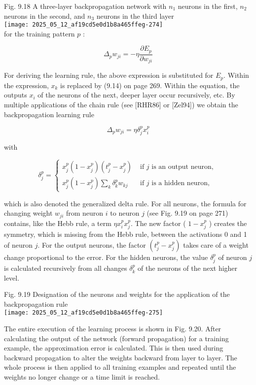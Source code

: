 \documentclass[10pt]{article}
\begin{document}
Fig. 9.18 A three-layer backpropagation network with $n_{1}$ neurons in the first, $n_{2}$ neurons in the second, and $n_{3}$ neurons in the third layer\\
\texttt{[image: 2025\_05\_12\_af19cd5e0d1b8a465ffeg-274]}\\
for the training pattern $p$ :

$$
\Delta_{p} w_{j i}=-\eta \frac{\partial E_{p}}{\partial w_{j i}}
$$

For deriving the learning rule, the above expression is substituted for $E_{p}$. Within the expression, $x_{k}$ is replaced by (9.14) on page 269. Within the equation, the outputs $x_{i}$ of the neurons of the next, deeper layer occur recursively, etc. By multiple applications of the chain rule (see [RHR86] or [Zel94]) we obtain the backpropagation learning rule

$$
\Delta_{p} w_{j i}=\eta \delta_{j}^{p} x_{i}^{p}
$$

with

$$
\delta_{j}^{p}= \begin{cases}x_{j}^{p}\left(1-x_{j}^{p}\right)\left(t_{j}^{p}-x_{j}^{p}\right) & \text { if } j \text { is an output neuron, } \\ x_{j}^{p}\left(1-x_{j}^{p}\right) \sum_{k} \delta_{k}^{p} w_{k j} & \text { if } j \text { is a hidden neuron, }\end{cases}
$$

which is also denoted the generalized delta rule. For all neurons, the formula for changing weight $w_{j i}$ from neuron $i$ to neuron $j$ (see Fig. 9.19 on page 271) contains, like the Hebb rule, a term $\eta x_{i}^{p} x_{j}^{p}$. The new factor ( $1-x_{j}^{p}$ ) creates the symmetry, which is missing from the Hebb rule, between the activations 0 and 1 of neuron $j$. For the output neurons, the factor $\left(t_{j}^{p}-x_{j}^{p}\right)$ takes care of a weight change proportional to the error. For the hidden neurons, the value $\delta_{j}^{p}$ of neuron $j$ is calculated recursively from all changes $\delta_{k}^{p}$ of the neurons of the next higher level.

Fig. 9.19 Designation of the neurons and weights for the application of the backpropagation rule\\
\texttt{[image: 2025\_05\_12\_af19cd5e0d1b8a465ffeg-275]}

The entire execution of the learning process is shown in Fig. 9.20. After calculating the output of the network (forward propagation) for a training example, the approximation error is calculated. This is then used during backward propagation to alter the weights backward from layer to layer. The whole process is then applied to all training examples and repeated until the weights no longer change or a time limit is reached.
\end{document}

